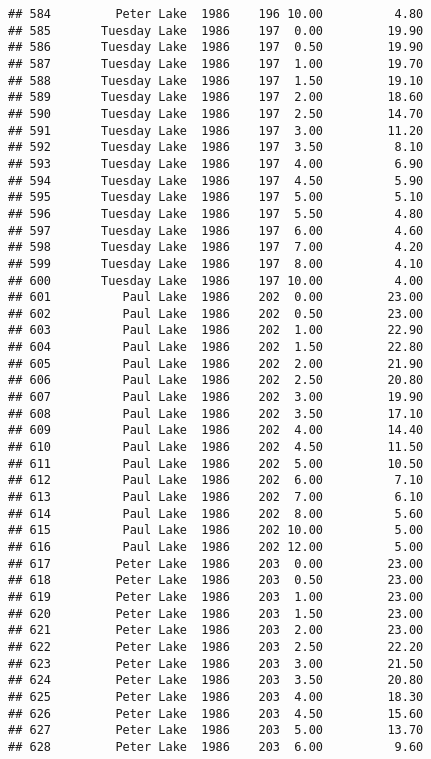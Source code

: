 \documentclass[
]{article}
\begin{document}
\begin{verbatim}
## 584         Peter Lake  1986    196 10.00          4.80
## 585       Tuesday Lake  1986    197  0.00         19.90
## 586       Tuesday Lake  1986    197  0.50         19.90
## 587       Tuesday Lake  1986    197  1.00         19.70
## 588       Tuesday Lake  1986    197  1.50         19.10
## 589       Tuesday Lake  1986    197  2.00         18.60
## 590       Tuesday Lake  1986    197  2.50         14.70
## 591       Tuesday Lake  1986    197  3.00         11.20
## 592       Tuesday Lake  1986    197  3.50          8.10
## 593       Tuesday Lake  1986    197  4.00          6.90
## 594       Tuesday Lake  1986    197  4.50          5.90
## 595       Tuesday Lake  1986    197  5.00          5.10
## 596       Tuesday Lake  1986    197  5.50          4.80
## 597       Tuesday Lake  1986    197  6.00          4.60
## 598       Tuesday Lake  1986    197  7.00          4.20
## 599       Tuesday Lake  1986    197  8.00          4.10
## 600       Tuesday Lake  1986    197 10.00          4.00
## 601          Paul Lake  1986    202  0.00         23.00
## 602          Paul Lake  1986    202  0.50         23.00
## 603          Paul Lake  1986    202  1.00         22.90
## 604          Paul Lake  1986    202  1.50         22.80
## 605          Paul Lake  1986    202  2.00         21.90
## 606          Paul Lake  1986    202  2.50         20.80
## 607          Paul Lake  1986    202  3.00         19.90
## 608          Paul Lake  1986    202  3.50         17.10
## 609          Paul Lake  1986    202  4.00         14.40
## 610          Paul Lake  1986    202  4.50         11.50
## 611          Paul Lake  1986    202  5.00         10.50
## 612          Paul Lake  1986    202  6.00          7.10
## 613          Paul Lake  1986    202  7.00          6.10
## 614          Paul Lake  1986    202  8.00          5.60
## 615          Paul Lake  1986    202 10.00          5.00
## 616          Paul Lake  1986    202 12.00          5.00
## 617         Peter Lake  1986    203  0.00         23.00
## 618         Peter Lake  1986    203  0.50         23.00
## 619         Peter Lake  1986    203  1.00         23.00
## 620         Peter Lake  1986    203  1.50         23.00
## 621         Peter Lake  1986    203  2.00         23.00
## 622         Peter Lake  1986    203  2.50         22.20
## 623         Peter Lake  1986    203  3.00         21.50
## 624         Peter Lake  1986    203  3.50         20.80
## 625         Peter Lake  1986    203  4.00         18.30
## 626         Peter Lake  1986    203  4.50         15.60
## 627         Peter Lake  1986    203  5.00         13.70
## 628         Peter Lake  1986    203  6.00          9.60

\end{verbatim}
\end{document}

